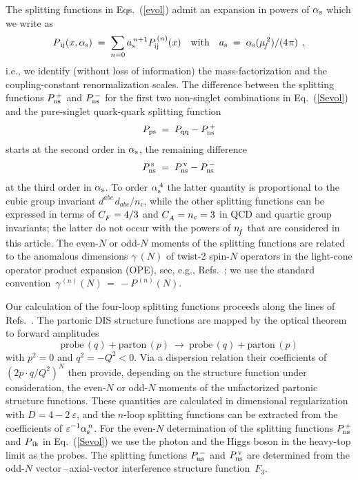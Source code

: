 \documentclass[12pt]{article}
\newcommand{\beq}{\begin{equation}}
\newcommand{\eeq}{\end{equation}}
\newcommand{\als}{\alpha_{\rm s}}
\newcommand{\ep}{\varepsilon}
\newcommand{\mufs}{\mu_{\!\!\,f}^{\,2}}
\begin{document}
The splitting functions in Eqs.~(\ref{evol}) admit an expansion in powers of 
$\als$ which we write as
%
\beq
\label{Pexp}
  P_{\,\rm ij}(x,\als) \; = \; 
  \sum_{n=0} a_{\rm s}^{\,n+1} P^{\,(n)}_{\rm ij}(x)
\quad \mbox{with} \quad
  a_{\rm s} \;=\; \als(\mufs) / (4 \:\!\pi)
\:\: ,
\eeq
%
i.e., we identify (without loss of information) the mass-factorization and 
the coupling-constant renormalization scales.
The difference between the splitting functions $P_{\rm ns}^{\,+}$ and 
$P_{\rm ns}^{\,-}$ for the first two non-singlet combinations in 
Eq.~(\ref{Sevol}) and the pure-singlet quark-quark splitting function
%
\beq
\label{Pps}
   P_{\rm ps} \;=\; P_{\rm qq} - P_{\rm ns}^{\,+} 
\eeq
%
starts at the second order in $\als$, the remaining difference
%
\beq
\label{PnsS}
   P_{\rm ns}^{\,\rm s} \;=\; P_{\rm ns}^{\,\rm v} - P_{\rm ns}^{\,-}
\eeq
%
at the third order in $\als$. To order $\as(4)$ the latter quantity is 
proportional to the cubic group invariant $d^{abc\,}d_{abc}/n_c$, while
the other splitting functions can be expressed in terms of ${C^{}_F} = 4/3$ and
${C^{}_A} = n_c = 3$ in QCD and quartic group invariants; the latter do not
occur with the powers of ${n^{}_{\! f}}$ that are considered in this article.
The even-$N$ or odd-$N$ moments of the splitting functions are related to
the anomalous dimensions $\gamma\:\!(N)$ of twist-2 spin-$N$ operators in 
the light-cone operator product expansion (OPE), see, e.g., Refs.\ 
\cite{BurasRev,ReyaRev}; we use the standard convention 
$\,\gamma^{\,(n)}(N) \,=\, - P^{\,(n)}(N)$.

Our calculation of the four-loop splitting functions proceeds along the
lines of Refs.~\cite{Mom3loop1,Mom3loop2,Mom3loop3}.
The partonic DIS structure functions are mapped by the optical theorem to 
forward amplitudes
%
\beq
\label{ampl}
 \mbox{probe}\,(q)+\mbox{parton}\,(p) \:\longrightarrow\:
 \mbox{probe}\,(q)+\mbox{parton}\,(p) 
\eeq
%
with $p^2 = 0$ and $q^2 = -Q^2 < 0$. Via a dispersion relation their 
coefficients of $(2p\cdot q/Q^2)^N$ then provide, depending on the structure 
function under consideration, the even-$N$ or odd-$N$ moments of the 
unfactorized partonic structure functions.
These quantities are calculated in dimensional regularization with 
$D = 4 - 2\:\!\ep$, and the $n$-loop splitting functions can be extracted 
from the coefficients of $\ep^{-1} \alpha_{\rm s}^{\,n}$.
For the even-$N$ determination of the splitting functions $P_{\rm ns}^{\,+}$
and $P_{\,\rm ik}$ in Eq.~(\ref{Sevol}) we use the photon and the Higgs
boson in the heavy-top limit as the probes. The splitting functions 
$P_{\rm ns}^{\,-}$ and $P_{\rm ns}^{\,\rm v}$ are determined from the 
odd-$N$ vector$\,$--$\,$axial-vector interference structure function~$F_3$.
\end{document}
